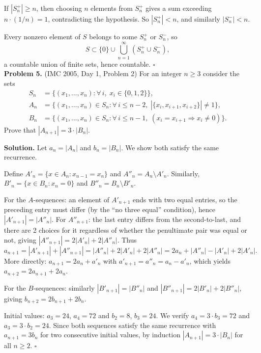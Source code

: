 \documentclass{article}
\begin{document}
If \( |S_n^+| \geq n \), then choosing \( n \) elements from \( S_n^+ \) gives a sum exceeding \( n \cdot (1/n) = 1 \), contradicting the hypothesis. So \( |S_n^+| < n \), and similarly \( |S_n^-| < n \).

Every nonzero element of \( S \) belongs to some \( S_n^+ \) or \( S_n^- \), so
\[
S \subset \{0\} \cup \bigcup_{n=1}^{\infty} (S_n^+ \cup S_n^-),
\]
a countable union of finite sets, hence countable. \hfill\(\square\)
\\

\textbf{Problem 5.} (IMC 2005, Day 1, Problem 2)
For an integer \( n \geq 3 \) consider the sets
\begin{align*}
S_n &= \{(x_1, \ldots, x_n) : \forall\, i,\; x_i \in \{0,1,2\}\}, \\
A_n &= \{(x_1, \ldots, x_n) \in S_n : \forall\, i \leq n-2,\; |\{x_i, x_{i+1}, x_{i+2}\}| \neq 1\}, \\
B_n &= \{(x_1, \ldots, x_n) \in S_n : \forall\, i \leq n-1,\; (x_i = x_{i+1} \Rightarrow x_i \neq 0)\}.
\end{align*}
Prove that \( |A_{n+1}| = 3 \cdot |B_n| \).

\textbf{Solution.}
Let \( a_n = |A_n| \) and \( b_n = |B_n| \). We show both satisfy the same recurrence.

Define \( A'_n = \{x \in A_n : x_{n-1} = x_n\} \) and \( A''_n = A_n \setminus A'_n \). Similarly, \( B'_n = \{x \in B_n : x_n = 0\} \) and \( B''_n = B_n \setminus B'_n \).

For the \( A \)-sequences: an element of \( A'_{n+1} \) ends with two equal entries, so the preceding entry must differ (by the ``no three equal'' condition), hence \( |A'_{n+1}| = |A''_n| \). For \( A''_{n+1} \): the last entry differs from the second-to-last, and there are 2 choices for it regardless of whether the penultimate pair was equal or not, giving \( |A''_{n+1}| = 2|A'_n| + 2|A''_n| \). Thus
\[
a_{n+1} = |A'_{n+1}| + |A''_{n+1}| = |A''_n| + 2|A'_n| + 2|A''_n| = 2a_n + |A''_n| - |A'_n| + 2|A'_n|.
\]
More directly: \( a_{n+1} = 2a_n + a'_n \) with \( a'_{n+1} = a''_n = a_n - a'_n \), which yields \( a_{n+2} = 2a_{n+1} + 2a_n \).

For the \( B \)-sequences: similarly \( |B'_{n+1}| = |B''_n| \) and \( |B''_{n+1}| = 2|B'_n| + 2|B''_n| \), giving \( b_{n+2} = 2b_{n+1} + 2b_n \).

Initial values: \( a_3 = 24 \), \( a_4 = 72 \) and \( b_2 = 8 \), \( b_3 = 24 \). We verify \( a_4 = 3 \cdot b_3 = 72 \) and \( a_3 = 3 \cdot b_2 = 24 \). Since both sequences satisfy the same recurrence with \( a_{n+1} = 3 b_n \) for two consecutive initial values, by induction \( |A_{n+1}| = 3 \cdot |B_n| \) for all \( n \geq 2 \). \hfill\(\square\)
\end{document}
